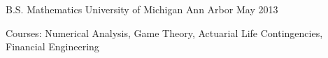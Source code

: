 

\begin{cventries}

  \cventry
    {B.S. Mathematics} %
    {University of Michigan} %
    {Ann Arbor} %
    {May 2013} %
    {
      \begin{cvitems} %
        \item {Courses: Numerical Analysis, Game Theory, Actuarial Life Contingencies, Financial Engineering}
      \end{cvitems}
    }

\end{cventries}
